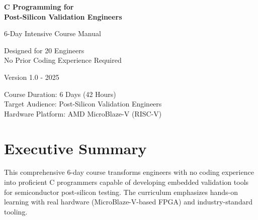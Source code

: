 \documentclass[11pt,a4paper]{article}
\begin{document}
\begin{titlepage}
    \centering
    \vspace*{2cm}

    {\Huge\bfseries C Programming for\\Post-Silicon Validation Engineers\par}
    \vspace{1cm}
    {\Large 6-Day Intensive Course Manual\par}
    \vspace{2cm}


    \vspace{2cm}
    {\large Designed for 20 Engineers\\No Prior Coding Experience Required\par}
    \vspace{1cm}
    {\large Version 1.0 - 2025\par}

    \vfill

    {\large Course Duration: 6 Days (42 Hours)\\
    Target Audience: Post-Silicon Validation Engineers\\
    Hardware Platform: AMD MicroBlaze-V (RISC-V)\par}
\end{titlepage}

\newpage
\tableofcontents
\newpage

\section{Executive Summary}

This comprehensive 6-day course transforms engineers with no coding experience into proficient C programmers capable of developing embedded validation tools for semiconductor post-silicon testing. The curriculum emphasizes hands-on learning with real hardware (MicroBlaze-V-based FPGA) and industry-standard tooling.
\end{document}
